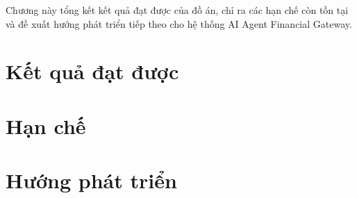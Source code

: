 
Chương này tổng kết kết quả đạt được của đồ án, chỉ ra các hạn chế còn tồn tại và đề xuất hướng phát triển tiếp theo cho hệ thống AI Agent Financial Gateway.

\section{Kết quả đạt được}


\section{Hạn chế}


\section{Hướng phát triển}

